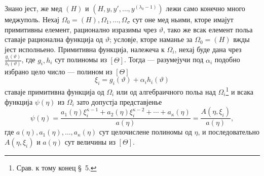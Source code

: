 ﻿\documentclass[11pt]{article}
\begin{document}
Знано јест, же мед $(H)$ и $(H,y,y',\ldots,y^{(\lambda_0-1)})$ лежи само
конечно много меджуполь. Нехај $\Omega_0=(H),\Omega_1,\ldots,\Omega_\sigma$
сут оне мед ньими, кторе имајут
примитивны елемент, рационално изразимы чрез $\vartheta$, тако же всак елемент
польа ставаје рационална функција од $\vartheta$; условје, кторе наманье за
$\Omega_0=(H)$ вжды јест исполньено. Примитивна функција, належеча к
$\Omega_i$, нехај буде дана чрез $\frac{g_i(\vartheta)}{h_i(\vartheta)}$, где
$g_i,h_i$ сут полиномы из $[\Theta]$. Тогда --- разумејучи под $\alpha_i$
подобно избрано цело число --- полином из $[\Theta]$
\[
 \xi_i=g_i(\vartheta)+\alpha_i h_i(\vartheta)
\]
ставаје примитивна функција од $\Omega_i$ или од алгебраичного польа над
$\Omega_i$\footnote{Срав. к тому конец \S\ 5.} и всака функција $\psi(\eta)$
из $\Omega_i$ зато допустја представјенье
\begin{equation}
\psi(\eta)=
\frac{a_1(\eta)\xi_i^{\kappa-1}+a_2(\eta)\xi_i^{\kappa-2}+\cdots+a_\kappa(\eta)}
     {a(\eta)}
=\frac{A(\eta,\xi_i)}{a(\eta)},
\tag{2}
\end{equation}
где $a(\eta),a_1(\eta),\ldots,a_\kappa(\eta)$ сут целочислене полиномы од
$\eta$, и последовательно $A(\eta,\xi_i)$ и $a(\eta)$ сут величины из
$[\Theta]$.
\end{document}
